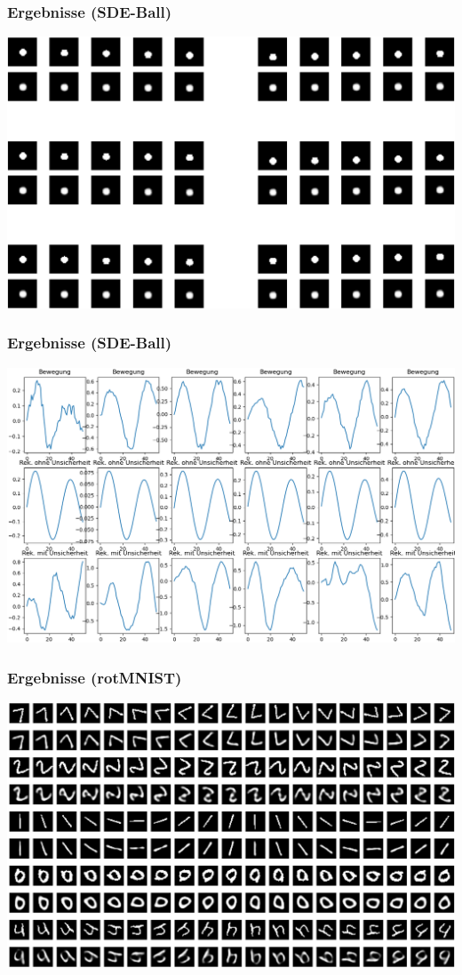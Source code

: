 \begin{frame}
	\frametitle{Ergebnisse (SDE-Ball)}
	\includegraphics[scale=0.3]{Bilder/SDE_Ball_rec.png}
\end{frame}

\begin{frame}
	\frametitle{Ergebnisse (SDE-Ball)}
	\includegraphics[scale=0.3]{Bilder/SDE_Ball_Ergebnisse.png}
\end{frame}


\begin{frame}
	\frametitle{Ergebnisse (rotMNIST)}
	\includegraphics[scale=0.3]{Bilder/SDE_rotMNIST_rec}
\end{frame}

